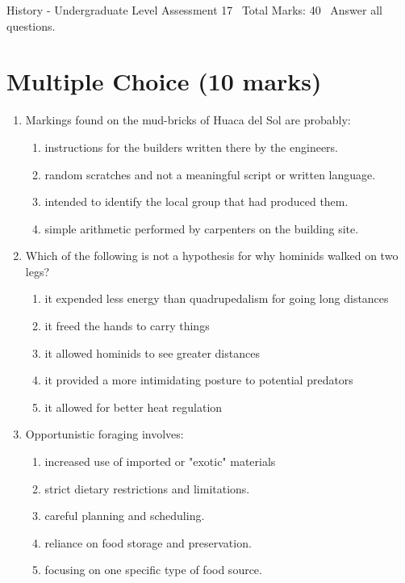 \documentclass[12pt]{article}
\begin{document}
\begin{center}
History - Undergraduate Level Assessment 17 \
Total Marks: 40 \
Answer all questions.
\end{center}

\section*{Multiple Choice (10 marks)}
\begin{enumerate}[label=\arabic*.]
\item Markings found on the mud-bricks of Huaca del Sol are probably:
\begin{enumerate}[label=(\alph*)]
    \item instructions for the builders written there by the engineers.
    \item random scratches and not a meaningful script or written language.
    \item intended to identify the local group that had produced them.
    \item simple arithmetic performed by carpenters on the building site.
\end{enumerate}
\item Which of the following is not a hypothesis for why hominids walked on two legs?
\begin{enumerate}[label=(\alph*)]
    \item it expended less energy than quadrupedalism for going long distances
    \item it freed the hands to carry things
    \item it allowed hominids to see greater distances
    \item it provided a more intimidating posture to potential predators
    \item it allowed for better heat regulation
\end{enumerate}
\item Opportunistic foraging involves:
\begin{enumerate}[label=(\alph*)]
    \item increased use of imported or "exotic" materials
    \item strict dietary restrictions and limitations.
    \item careful planning and scheduling.
    \item reliance on food storage and preservation.
    \item focusing on one specific type of food source.
\end{enumerate}

\end{enumerate}
\end{document}
